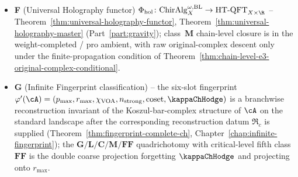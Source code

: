 \begin{itemize}
 complete chart model and a strong deformation retract onto
 $K_{\cA,S}$, with
 \[
  \ChirHoch^n(\cA)\cong H^n(K_{\cA,S}),
  \qquad
  \operatorname{Supp}\ChirHoch^\bullet(\cA)\subseteq S.
 \]
 Chiral Higher Deligne supplies the $E_2$-chiral brace structure on
 $\cZ^{\mathrm{der}}_{\mathrm{ch}}(\cA)$ and, under its mixed
 $\SCchtop$ coherence package, the chiral-topological datum on
 $(\cZ^{\mathrm{der}}_{\mathrm{ch}}(\cA),\cA)$:
 Theorem~\ref{thm:chiral-higher-deligne} in
 Chapter~\ref{ch:chiral-higher-deligne}
 (Part~\ref{part:gravity}).  Bakalov--De Sole--Kac \cite{BDSK21} give two exact
 bounded benchmarks: the rank-one even superboson has dimension
 vector $(2,1,0,\ldots)$, and $\operatorname{Vir}_c$ has
 one-dimensional groups in degrees $\{0,2,3\}$
 \cite[Theorems~7.4 and~7.2]{BDSK21}.  Each curve-chart use of
 these vectors includes its bounded-to-chart quasi-isomorphism.
 For a Calabi--Yau input~$Y$, HKR computes the separate categorical
 object $\HH^\bullet(D^b\mathrm{Coh}(Y))$.  Its passage to the
 chiral chart $A_Y=\Phi_d(Y)$ is governed by a comparison
 \[
  q_{\Phi,C}\colon
  \HH^\bullet(D^b\mathrm{Coh}(Y))longrightarrow
  \ChirHoch^\bullet(A_Y).
 \]
 The family datum $H_H(A_Y;S_Y)$ computes the target support;
 constructing $q_{\Phi,C}$ and its off-support null-homotopies is
 the CY-to-chiral comparison problem.  The filtered $E_3$-PBW route
 to the same family support is recorded as
 Conjecture~\ref{conj:H-concentration-via-E3-rigidity}.
\item \textbf{F} (Universal Holography functor)
 $\Phi_{\mathrm{hol}}\colon \mathrm{ChirAlg}^{\omega,\mathrm{BL}}_X
 \to \mathrm{HT\text{-}QFT}_{X \times \R}$ --
 Theorem~\ref{thm:universal-holography-functor},
 Theorem~\ref{thm:universal-holography-master}
 (Part~\ref{part:gravity}); class~$\mathbf{M}$ chain-level
 closure is in the weight-completed / pro ambient, with raw
 original-complex descent only under the finite-propagation condition
 of Theorem~\ref{thm:chain-level-e3-original-complex-conditional}.
\item \textbf{G} (Infinite Fingerprint classification) --
 the six-slot fingerprint
 $\varphi'(\cA) = (p_{\max}, r_{\max}, \chi_{\mathrm{VOA}},
 n_{\mathrm{strong}}, \mathrm{coset}, \kappaChHodge)$
 is a branchwise reconstruction invariant of the Koszul-bar-complex
 structure of $\cA$ on the standard landscape after the corresponding
 reconstruction datum \(\mathfrak R_c\) is supplied
 (Theorem~\ref{thm:fingerprint-complete-ch},
 Chapter~\ref{chap:infinite-fingerprint}); the
 $\mathbf{G}/\mathbf{L}/\mathbf{C}/\mathbf{M}/\mathbf{FF}$
 quadrichotomy with critical-level fifth class $\mathbf{FF}$ is
 the double coarse projection forgetting
 $\kappaChHodge$ and projecting onto $r_{\max}$.
\end{itemize}


